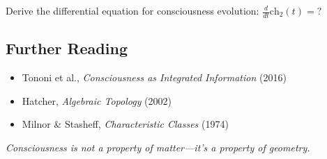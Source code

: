 \begin{level3}
Derive the differential equation for consciousness evolution: $\frac{d}{dt}\text{ch}_2(t) = ?$
\end{level3}

\subsection{Further Reading}

\begin{itemize}
\item Tononi et al., \textit{Consciousness as Integrated Information} (2016)
\item Hatcher, \textit{Algebraic Topology} (2002)
\item Milnor \& Stasheff, \textit{Characteristic Classes} (1974)
\end{itemize}

\vspace{1cm}

\begin{center}
\textit{Consciousness is not a property of matter—it's a property of geometry.}
\end{center}
